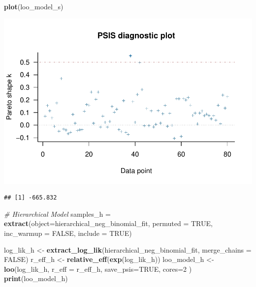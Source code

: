 \documentclass[]{article}
\newenvironment{Shaded}{\begin{snugshade}}{\end{snugshade}}
\newcommand{\KeywordTok}[1]{\textcolor[rgb]{0.13,0.29,0.53}{\textbf{#1}}}
\newcommand{\DataTypeTok}[1]{\textcolor[rgb]{0.13,0.29,0.53}{#1}}
\newcommand{\DecValTok}[1]{\textcolor[rgb]{0.00,0.00,0.81}{#1}}
\newcommand{\StringTok}[1]{\textcolor[rgb]{0.31,0.60,0.02}{#1}}
\newcommand{\CommentTok}[1]{\textcolor[rgb]{0.56,0.35,0.01}{\textit{#1}}}
\newcommand{\OtherTok}[1]{\textcolor[rgb]{0.56,0.35,0.01}{#1}}
\newcommand{\OperatorTok}[1]{\textcolor[rgb]{0.81,0.36,0.00}{\textbf{#1}}}
\newcommand{\NormalTok}[1]{#1}
\begin{document}
\begin{Shaded}
\begin{Highlighting}[]
\KeywordTok{plot}\NormalTok{(loo_model_s)}
\end{Highlighting}
\end{Shaded}

\includegraphics{Data_science_project_files/figure-latex/unnamed-chunk-22-1.pdf}

\begin{Shaded}
\end{Shaded}

\begin{verbatim}
## [1] -665.832
\end{verbatim}

\begin{Shaded}
\begin{Highlighting}[]
\CommentTok{# Hierarchical Model}
\NormalTok{samples_h =}\StringTok{ }\KeywordTok{extract}\NormalTok{(}\DataTypeTok{object=}\NormalTok{hierarchical_neg_binomial_fit, }\DataTypeTok{permuted =} \OtherTok{TRUE}\NormalTok{, }\DataTypeTok{inc_warmup =} \OtherTok{FALSE}\NormalTok{, }\DataTypeTok{include =} \OtherTok{TRUE}\NormalTok{)}

\NormalTok{log_lik_h <-}\StringTok{ }\KeywordTok{extract_log_lik}\NormalTok{(hierarchical_neg_binomial_fit, }\DataTypeTok{merge_chains =} \OtherTok{FALSE}\NormalTok{)}
\NormalTok{r_eff_h <-}\StringTok{ }\KeywordTok{relative_eff}\NormalTok{(}\KeywordTok{exp}\NormalTok{(log_lik_h))}
\NormalTok{loo_model_h <-}\StringTok{ }\KeywordTok{loo}\NormalTok{(log_lik_h, }\DataTypeTok{r_eff =}\NormalTok{ r_eff_h, }\DataTypeTok{save_psis=}\OtherTok{TRUE}\NormalTok{, }\DataTypeTok{cores=}\DecValTok{2}\NormalTok{ )}
\KeywordTok{print}\NormalTok{(loo_model_h)}
\end{Highlighting}
\end{Shaded}
\end{document}
